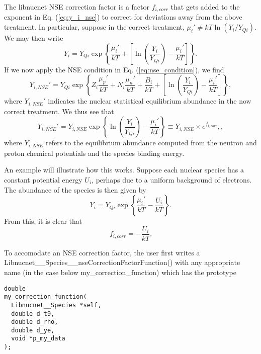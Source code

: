 \documentclass{article}    %
\begin{document}
The libnucnet NSE correction factor is a factor $f_{i,corr}$ that gets added
to the exponent in Eq. (\ref{eq:y_i_nse})
to correct for deviations away from the above treatment.  In particular,
suppose in the correct treatment,
$\mu_i' \neq kT \ln \left( Y_i / Y_{Qi} \right)$.  We may then write
\begin{equation}
Y_i = Y_{Qi} \exp\left\{\frac{\mu_i'}{kT} + \left[ \ln\left(\frac{Y_i}{Y_{Qi}}
\right)- \frac{\mu_i'}{kT}\right]\right\}.
\end{equation}
If we now apply the NSE condition in Eq. (\ref{eq:nse_condition}),
we find
\begin{equation}
Y_{i,NSE}' = Y_{Qi} \exp\left\{
Z_i \frac{\mu_p'}{kT} + N_i \frac{\mu_n'}{kT} + \frac{B_i}{kT} +
\left[ \ln\left(\frac{Y_i}{Y_{Qi}}
\right)- \frac{\mu_i'}{kT}\right]
\right\}, \label{eq:y_i_nse_f}
\end{equation}
where $Y_{i,NSE}'$ indicates the nuclear statistical equilibrium abundance
in the now correct
treatment.  We thus see that
\begin{equation}
Y_{i,NSE}' = Y_{i,NSE} \exp\left\{
\ln\left(\frac{Y_i}{Y_{Qi}}
\right)- \frac{\mu_i'}{kT}
\right\} \equiv Y_{i,NSE} \times e^{f_{i,corr}}, \label{eq:y_i_nse_f_2},
\end{equation}
where $Y_{i,NSE}$ refers to the equilibrium abundance computed from the
neutron and proton chemical potentials and the species binding energy.

An example will illustrate how this works.  Suppose each nuclear species
has a constant potential energy $U_i$, perhaps due to a uniform background
of electrons.  The abundance of the species is then given by
\begin{equation}
Y_i = Y_{Qi} \exp\left\{\frac{\mu_i'}{kT} - \frac{U_i}{kT}\right\}.
\end{equation}
From this, it is clear that
\begin{equation}
f_{i,corr} = -\frac{U_i}{kT}.
\end{equation}

To accomodate an NSE correction factor, the user first writes a
Libnucnet\_\_Species\_\_nseCorrectionFactorFunction() with any appropriate
name (in the case below my\_correction\_function)
which has the prototype

\begin{verbatim}
double
my_correction_function(
  Libnucnet__Species *self,
  double d_t9,
  double d_rho,
  double d_ye,
  void *p_my_data
);
\end{verbatim}
\end{document}
